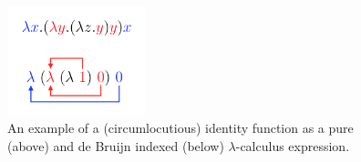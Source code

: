 \begin{figure}[h]

%

\centering
\includegraphics[width=4cm]{Figures/DeBruijnIndex}

\caption{An example of a (circumlocutious) identity function as a pure (above) and de Bruijn indexed (below) $\lambda$-calculus expression.}
\label{fig:db_example}
\end{figure}
